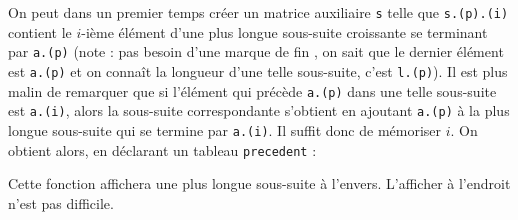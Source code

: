 \Q
On peut dans un premier temps créer un matrice auxiliaire \texttt{s} telle que \texttt{s.(p).(i)} contient le $i$-ième élément d'une plus longue sous-suite croissante se terminant par \texttt{a.(p)} (note : pas besoin d'une \og marque de fin \fg{}, on sait que le dernier élément est \texttt{a.(p)} et on connaît la longueur d'une telle sous-suite, c'est \texttt{l.(p)}). Il est plus malin de remarquer que si l'élément qui précède \texttt{a.(p)} dans une telle sous-suite est \texttt{a.(i)}, alors la sous-suite correspondante s'obtient en ajoutant \texttt{a.(p)} à la plus longue sous-suite qui se termine par \texttt{a.(i)}. Il suffit donc de mémoriser $i$. On obtient alors, en déclarant un tableau \texttt{precedent} :



Cette fonction affichera une plus longue sous-suite à l'envers. L'afficher à l'endroit n'est pas difficile.

\Fin
